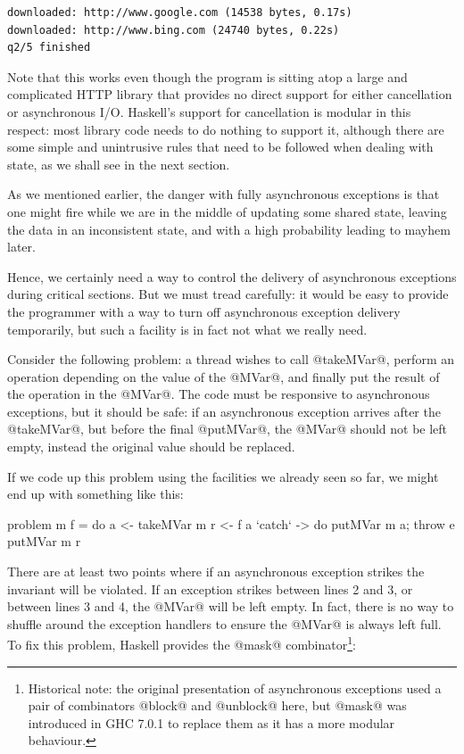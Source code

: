 \begin{verbatim}
downloaded: http://www.google.com (14538 bytes, 0.17s)
downloaded: http://www.bing.com (24740 bytes, 0.22s)
q2/5 finished
\end{verbatim}

Note that this works even though the program is sitting atop a large
and complicated HTTP library that provides no direct support for
either cancellation or asynchronous I/O.  Haskell's support for
cancellation is modular in this respect: most library code needs to do
nothing to support it, although there are some simple and unintrusive
rules that need to be followed when dealing with state, as we shall
see in the next section.


As we mentioned earlier, the danger with fully asynchronous exceptions
is that one might fire while we are in the middle of updating some
shared state, leaving the data in an inconsistent state, and with a
high probability leading to mayhem later.

Hence, we certainly need a way to control the delivery of asynchronous
exceptions during critical sections.  But we must tread carefully: it
would be easy to provide the programmer with a way to turn off
asynchronous exception delivery temporarily, but such a facility is in
fact not what we really need.

Consider the following problem: a thread wishes to call @takeMVar@,
perform an operation depending on the value of the @MVar@, and finally
put the result of the operation in the @MVar@.  The code must be
responsive to asynchronous exceptions, but it should be safe: if an
asynchronous exception arrives after the @takeMVar@, but before the
final @putMVar@, the @MVar@ should not be left empty, instead the
original value should be replaced.

If we code up this problem using the facilities we already seen so
far, we might end up with something like this:

\begin{numhaskell}
problem m f = do
  a <- takeMVar m
  r <- f a `catch` \e -> do putMVar m a; throw e
  putMVar m r
\end{numhaskell}

\noindent There are at least two points where if an asynchronous
exception strikes the invariant will be violated.  If an exception
strikes between lines 2 and 3, or between lines 3 and 4, the @MVar@
will be left empty.  In fact, there is no way to shuffle around the
exception handlers to ensure the @MVar@ is always left full.  To fix
this problem, Haskell provides the @mask@
combinator\footnote{Historical note: the original presentation of
  asynchronous exceptions used a pair of combinators @block@ and
  @unblock@ here, but @mask@ was introduced in GHC 7.0.1 to replace
  them as it has a more modular behaviour.}:

